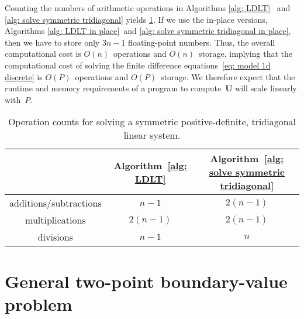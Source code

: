 Counting the numbers of arithmetic operations in Algorithms
\ref{alg: LDLT}~ and \ref{alg: solve symmetric tridiagonal} yields
\cref{tab: LDLT flops}.  If we use the in-place versions, 
Algorithms \ref{alg: LDLT in place}~and 
\ref{alg: solve symmetric tridiagonal in place}, then we have to store only
$3n-1$ floating-point numbers.  Thus, the overall computational cost is 
$O(n)$~operations and $O(n)$~storage, implying that the computational cost of
solving the finite difference equations~\eqref{eq: model 1d discrete} is 
$O(P)$~operations and $O(P)$~storage.  We therefore expect that the runtime and 
memory requirements of a program to compute~$\boldsymbol{U}$ will scale 
linearly with~$P$.

\begin{table}
\caption{Operation counts for solving a symmetric positive-definite, 
tridiagonal linear system.}\label{tab: LDLT flops}
\begin{center}
\begin{tabular}{c|c|c}
&Algorithm~\ref{alg: LDLT}
&Algorithm~\ref{alg: solve symmetric 
tridiagonal}\\
\hline
additions/subtractions&   $n-1$&$2(n-1)$\\
       multiplications&$2(n-1)$&$2(n-1)$\\
             divisions&   $n-1$&$n$
\end{tabular}
\end{center}
\end{table}


\section{General two-point boundary-value problem}
\label{sec: gen two-point bvp}

